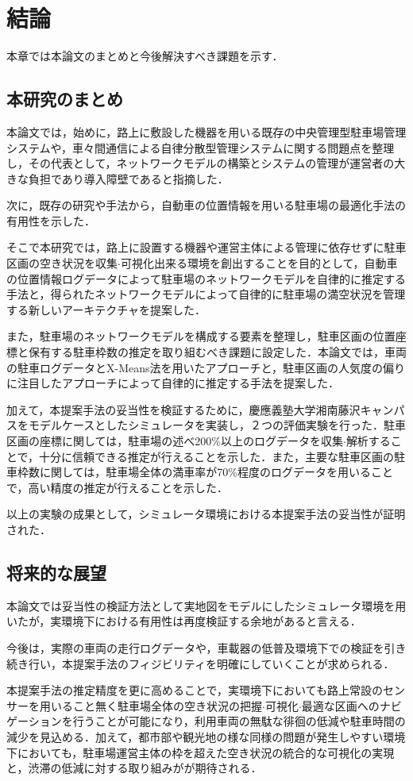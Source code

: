 
\chapter{結論}
\label{conclusion}
本章では本論文のまとめと今後解決すべき課題を示す．

\section{本研究のまとめ}

本論文では，始めに，路上に敷設した機器を用いる既存の中央管理型駐車場管理システムや，車々間通信による自律分散型管理システムに関する問題点を整理し，その代表として，ネットワークモデルの構築とシステムの管理が運営者の大きな負担であり導入障壁であると指摘した．

次に，既存の研究や手法から，自動車の位置情報を用いる駐車場の最適化手法の有用性を示した．

そこで本研究では，路上に設置する機器や運営主体による管理に依存せずに駐車区画の空き状況を収集$\cdot$可視化出来る環境を創出することを目的として，自動車の位置情報ログデータによって駐車場のネットワークモデルを自律的に推定する手法と，得られたネットワークモデルによって自律的に駐車場の満空状況を管理する新しいアーキテクチャを提案した．

また，駐車場のネットワークモデルを構成する要素を整理し，駐車区画の位置座標と保有する駐車枠数の推定を取り組むべき課題に設定した．本論文では，車両の駐車ログデータとX-Means法を用いたアプローチと，駐車区画の人気度の偏りに注目したアプローチによって自律的に推定する手法を提案した．

加えて，本提案手法の妥当性を検証するために，慶應義塾大学湘南藤沢キャンパスをモデルケースとしたシミュレータを実装し，２つの評価実験を行った．駐車区画の座標に関しては，駐車場の述べ200\%以上のログデータを収集$\cdot$解析することで，十分に信頼できる推定が行えることを示した．また，主要な駐車区画の駐車枠数に関しては，駐車場全体の満車率が70\%程度のログデータを用いることで，高い精度の推定が行えることを示した．

以上の実験の成果として，シミュレータ環境における本提案手法の妥当性が証明された．



\section{将来的な展望}
本論文では妥当性の検証方法として実地図をモデルにしたシミュレータ環境を用いたが，実環境下における有用性は再度検証する余地があると言える．

今後は，実際の車両の走行ログデータや，車載器の低普及環境下での検証を引き続き行い，本提案手法のフィジビリティを明確にしていくことが求められる．

本提案手法の推定精度を更に高めることで，実環境下においても路上常設のセンサーを用いること無く駐車場全体の空き状況の把握$\cdot$可視化$\cdot$最適な区画へのナビゲーションを行うことが可能になり，利用車両の無駄な徘徊の低減や駐車時間の減少を見込める．加えて，都市部や観光地の様な同様の問題が発生しやすい環境下においても，駐車場運営主体の枠を超えた空き状況の統合的な可視化の実現と，渋滞の低減に対する取り組みがが期待される．